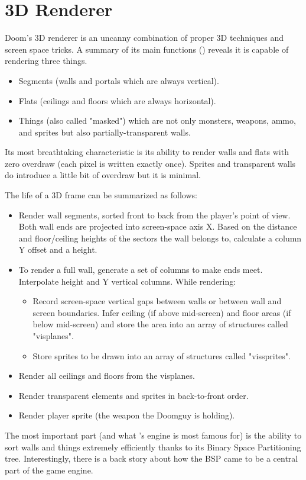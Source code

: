\section{3D Renderer}
Doom's 3D renderer is an uncanny combination of proper 3D techniques and screen space tricks. A summary of its main functions () reveals it is capable of rendering three things.\\
\par
{}
\par
\begin{itemize}
	\item Segments (walls and portals which are always vertical).
	\item Flats (ceilings and floors which are always horizontal).
	\item Things (also called "masked") which are not only monsters, weapons, ammo, and sprites but also partially-transparent walls.
\end{itemize}
 Its most breathtaking characteristic is its ability to render walls and flats with zero overdraw (each pixel is written exactly once). Sprites and transparent walls do introduce a little bit of overdraw but it is minimal.\\
\par
The life of a 3D frame can be summarized as follows:
\begin{itemize}
\item Render wall segments, sorted front to back from the player's point of view. Both wall ends are projected into screen-space axis X. Based on the distance and floor/ceiling heights of the sectors the wall belongs to, calculate a column Y offset and a height. 
\item To render a full wall, generate a set of columns to make ends meet. Interpolate height and Y vertical columns. While rendering:
   \begin{itemize}
     \item Record screen-space vertical gaps between walls or between wall and screen boundaries. Infer ceiling (if above mid-screen) and floor areas (if below mid-screen) and store the area into an array of structures called "visplanes".
     \item Store sprites to be drawn into an array of structures called "vissprites".
   \end{itemize}
\item Render all ceilings and floors from the visplanes.
\item Render transparent elements and sprites in back-to-front order.
\item Render player sprite (the weapon the Doomguy is holding).
\end{itemize}
\par
The most important part (and what \doom{}'s engine is most famous for) is the ability to sort walls and things extremely efficiently thanks to its Binary Space Partitioning tree. Interestingly, there is a back story about how the BSP came to be a central part of the game engine.\\
\par
\pagebreak




